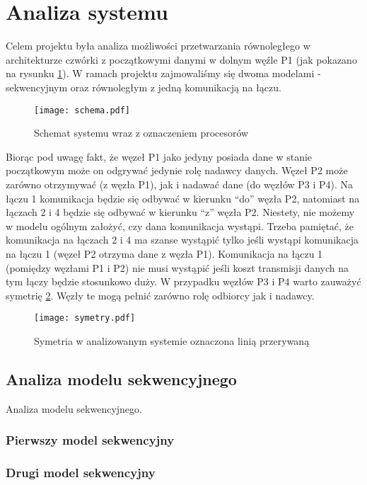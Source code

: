 
\section{Analiza systemu}

Celem projektu była analiza możliwości przetwarzania równoległego w architekturze czwórki z początkowymi danymi w dolnym węźle P1 (jak pokazano na rysunku \ref{fig:schema}).
W ramach projektu zajmowaliśmy się dwoma modelami - sekwencyjnym oraz równoległym z jedną komunikacją na łączu.

\begin{figure}[!ht]
\centering
\texttt{[image: schema.pdf]}
\caption{Schemat systemu wraz z oznaczeniem procesorów}
\label{fig:schema}
\end{figure}

Biorąc pod uwagę fakt, że węzeł P1 jako jedyny  posiada dane w stanie początkowym może on odgrywać jedynie rolę nadawcy danych. Węzeł P2 może zarówno otrzymywać (z węzła P1), jak i nadawać dane (do węzłów P3 i P4). Na łączu 1 komunikacja będzie się odbywać w kierunku “do” węzła P2, natomiast na łączach 2 i 4 będzie się odbywać w kierunku “z” węzła P2. Niestety, nie możemy w modelu ogólnym założyć, czy dana komunikacja wystąpi. Trzeba pamiętać, że komunikacja na łączach 2 i 4 ma szanse wystąpić tylko jeśli wystąpi komunikacja na łączu 1 (węzeł P2 otrzyma dane z węzła P1). Komunikacja na łączu 1 (pomiędzy węzłami P1 i P2) nie musi wystąpić jeśli koszt transmisji danych na tym łączy będzie stosunkowo duży. W przypadku węzłów P3 i P4 warto zauważyć symetrię \ref{fig:symetry}. Węzły te mogą pełnić zarówno rolę odbiorcy jak i nadawcy.

\begin{figure}[!ht]
\centering
\texttt{[image: symetry.pdf]}
\caption{Symetria w analizowanym systemie oznaczona linią przerywaną}
\label{fig:symetry}
\end{figure}
 
\subsection{Analiza modelu sekwencyjnego}

Analiza modelu sekwencyjnego.

\subsubsection{Pierwszy model sekwencyjny}

\subsubsection{Drugi model sekwencyjny}

